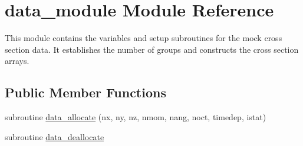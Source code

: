 \hypertarget{classdata__module}{\section{data\-\_\-module Module Reference}
\label{classdata__module}
}


This module contains the variables and setup subroutines for the mock cross section data. It establishes the number of groups and constructs the cross section arrays.  


\subsection*{Public Member Functions}
\begin{DoxyCompactItemize}
\item 
subroutine \hyperlink{classdata__module_ade2204272a3d3184a17a625aec6795ab}{data\-\_\-allocate} (nx, ny, nz, nmom, nang, noct, timedep, istat)
\item 
subroutine \hyperlink{classdata__module_a64ba259f44e41619101dc90b61ef1b28}{data\-\_\-deallocate}
\end{DoxyCompactItemize}
